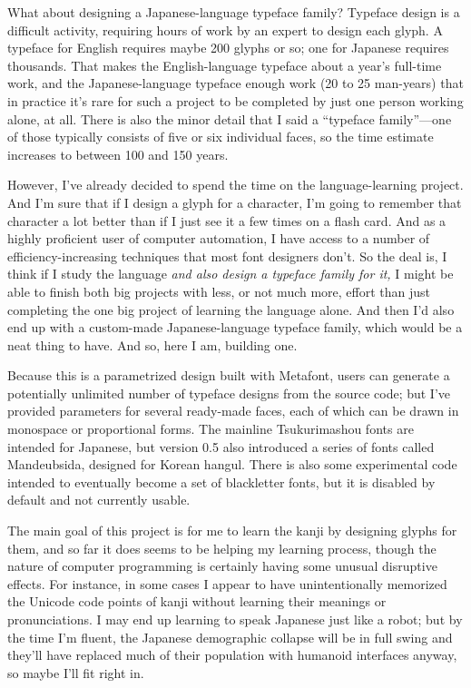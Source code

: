 \documentclass[14pt]{extarticle}
\begin{document}
What about designing a Japanese-language typeface family?  Typeface design
is a difficult activity, requiring hours of work by an expert to design each
glyph.  A typeface for English requires maybe 200 glyphs or so; one for
Japanese requires thousands.  That makes the English-language typeface about
a year's full-time work, and the Japanese-language typeface enough work (20
to 25 man-years) that in practice it's rare for such a project to be
completed by just one person working alone, at all.  There is also the minor
detail that I said a ``typeface family''---one of those typically consists
of five or six individual faces, so the time estimate increases to between
100 and 150 years.

However, I've already decided to spend the time on the language-learning
project.  And I'm sure that if I design a glyph for a character, I'm going
to remember that character a lot better than if I just see it a few times on
a flash card.  And as a highly proficient user of computer automation, I
have access to a number of efficiency-increasing techniques that most font
designers don't.  So the deal is, I think if I study the language
\emph{and also design a typeface family for it,} I might be able to
finish both big projects with less, or not much more, effort than just
completing the one big project of learning the language alone.  And then I'd
also end up with a custom-made Japanese-language typeface family, which
would be a neat thing to have.  And so, here I am, building one.

Because this is a parametrized design built with Metafont, users can
generate a potentially unlimited number of typeface designs from the source
code; but I've provided parameters for several ready-made faces, each of
which can be drawn in monospace or proportional forms.  The mainline
Tsukurimashou fonts are intended for Japanese, but version 0.5 also
introduced a series of fonts called Mandeubsida, designed for Korean
hangul.  There is also some experimental code intended to eventually become
a set of blackletter fonts, but it is disabled by default and not currently
usable.

The main goal of this project is for me to learn the kanji by designing
glyphs for them, and so far it does seems to be helping my learning process,
though the nature of computer programming is certainly having some unusual
disruptive effects.  For instance, in some cases I appear to have
unintentionally memorized the Unicode code points of kanji without learning
their meanings or pronunciations.  I may end up learning to speak Japanese
just like a robot; but by the time I'm fluent, the Japanese demographic
collapse will be in full swing and they'll have replaced much of their
population with humanoid interfaces anyway, so maybe I'll fit right in.
\end{document}
